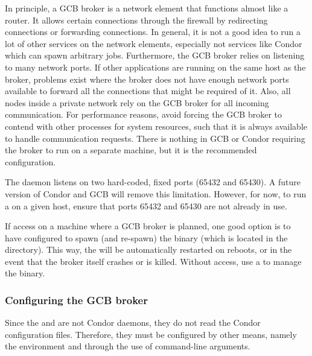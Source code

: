 In principle, a GCB broker is a network element that functions almost
like a router.
It allows certain connections through the firewall by redirecting
connections or forwarding connections.
In general, it is not a good idea to run a lot of other services on
the network elements, especially not services like Condor which can
spawn arbitrary jobs.
Furthermore, the GCB broker relies on listening to many network
ports.
If other applications are running on the same host as the broker,
problems exist
where the broker does not have enough network
ports available to forward all the connections that might be required
of it.
Also, all nodes inside a private network rely on the GCB broker for
all incoming communication.
For performance reasons, avoid forcing the GCB broker to
contend with other processes for system resources, such that it is always
available to handle communication requests.
There is nothing in GCB or Condor requiring
the broker to run on a separate machine, 
but it is the recommended configuration.

The  daemon listens on two hard-coded,
fixed ports (65432 and 65430).
A future version of Condor and GCB will remove this limitation.
However, for now, to run a  on a
given host, ensure that ports 65432 and 65430 are not already
in use. 

If  access on a machine where a GCB 
broker is planned, one good option is to have  configured to
spawn (and re-spawn) the  binary (which is located in
the  directory).
This way, the  will be automatically restarted on
reboots, or in the event that the broker itself crashes or is killed.
Without  access, use a  to
manage the  binary. 

\subsubsection{\label{sec:GCB-Broker-Config}
Configuring the GCB broker}

Since the  and  are not
Condor daemons, they do not read the Condor configuration
files.
Therefore, they must be configured by other means, namely the
environment and through the use of command-line arguments.

